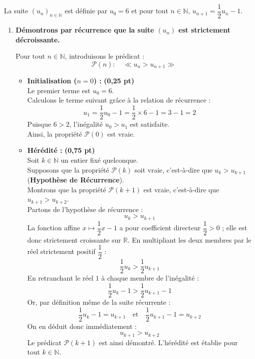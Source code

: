 \documentclass[11pt,a4paper]{article}
\newcommand{\bareme}[1]{\hfill\textbf{\textcolor{secondary}{\sffamily[#1]}}}
\newcommand{\pts}[1]{\textbf{\textcolor{secondary}{\sffamily(#1)}}}
\newcommand{\N}{\mathbb{N}}
\newcommand{\R}{\mathbb{R}}
\begin{document}
\begin{correctionbox}[Corrigé de l'Exercice 1 \bareme{Total : 4 points}]
La suite $(u_n)_{n \in \N}$ est définie par $u_0 = 6$ et pour tout $n \in \N$, $u_{n+1} = \dfrac{1}{2}u_n - 1$.

\begin{enumerate}[label=\textbf{\arabic*.}]
    \item \textbf{Démontrons par récurrence que la suite $(u_n)$ est strictement décroissante.} \bareme{1,25 pt}

    Pour tout $n \in \N$, introduisons le prédicat :
    \[
    \mathcal{P}(n) : \quad \ll u_n > u_{n+1} \gg
    \]
    
    \begin{itemize}[leftmargin=*, label=$\bullet$]
        \item \textbf{Initialisation ($n = 0$) :} \pts{0,25 pt}\\
        Le premier terme est $u_0 = 6$.\\
        Calculons le terme suivant grâce à la relation de récurrence :
        \[
        u_1 = \frac{1}{2} u_0 - 1 = \frac{1}{2} \times 6 - 1 = 3 - 1 = 2
        \]
        Puisque $6 > 2$, l'inégalité $u_0 > u_1$ est satisfaite.\\
        Ainsi, la propriété $\mathcal{P}(0)$ est vraie.

        \item \textbf{Hérédité :} \pts{0,75 pt}\\
        Soit $k \in \N$ un entier fixé quelconque.\\
        Supposons que la propriété $\mathcal{P}(k)$ soit vraie, c'est-à-dire que $u_k > u_{k+1}$ (\textbf{Hypothèse de Récurrence}).\\
        Montrons que la propriété $\mathcal{P}(k+1)$ est vraie, c'est-à-dire que $u_{k+1} > u_{k+2}$.\\
        
        Partons de l'hypothèse de récurrence :
        \[
        u_k > u_{k+1}
        \]
        La fonction affine $x \mapsto \dfrac{1}{2}x - 1$ a pour coefficient directeur $\dfrac{1}{2} > 0$ ; elle est donc strictement croissante sur $\R$. En multipliant les deux membres par le réel strictement positif $\dfrac{1}{2}$ :
        \[
        \frac{1}{2}u_k > \frac{1}{2}u_{k+1}
        \]
        En retranchant le réel $1$ à chaque membre de l'inégalité :
        \[
        \frac{1}{2}u_k - 1 > \frac{1}{2}u_{k+1} - 1
        \]
        Or, par définition même de la suite récurrente :
        \[
        \frac{1}{2}u_k - 1 = u_{k+1} \quad \text{et} \quad \frac{1}{2}u_{k+1} - 1 = u_{k+2}
        \]
        On en déduit donc immédiatement :
        \[
        u_{k+1} > u_{k+2}
        \]
        Le prédicat $\mathcal{P}(k+1)$ est ainsi démontré. L'hérédité est établie pour tout $k \in \N$.


\end{itemize}
\end{enumerate}
\end{correctionbox}
\end{document}
